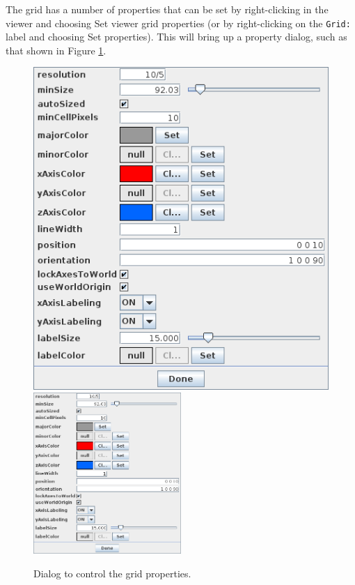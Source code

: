 \documentclass{article}
\begin{document}
The grid has a number of properties that can be set by right-clicking
in the viewer and choosing {\sf Set viewer grid properties} (or by
right-clicking on the {\tt Grid:} label and choosing {\sf Set
properties}). This will bring up a property dialog, such as that shown
in Figure \ref{GridPropDialog:fig}.

\begin{figure}
\begin{center}
\iflatexml
\includegraphics[]{images/gridPropDialog}
\else
\includegraphics[width=0.5\textwidth]{images/gridPropDialog}
\fi
\end{center}
\caption{Dialog to control the grid properties.}%
\label{GridPropDialog:fig}
\end{figure}
\end{document}
